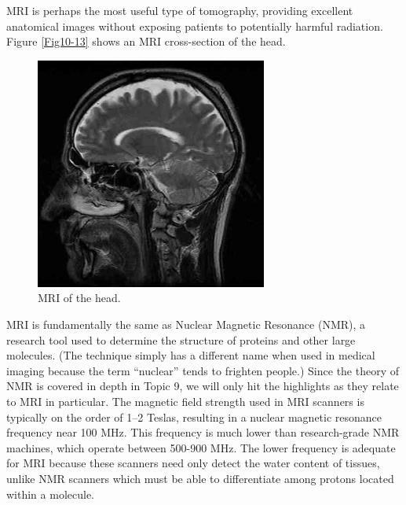 MRI is perhaps the most useful type of tomography, providing excellent anatomical images without exposing patients to potentially harmful radiation.  Figure \ref{Fig10-13} shows an MRI cross-section of the head.
\begin{figure}[!htb]
	\centering
	\includegraphics[width=3.0in]{./figures/Topic10/Fig10-14.jpg}
	\caption{MRI of the head.}
	\label{Fig10-14}
\end{figure}
MRI is fundamentally the same as Nuclear Magnetic Resonance (NMR), a research tool used to determine the structure of proteins and other large molecules.  (The technique simply has a different name when used in medical imaging because the term ``nuclear'' tends to frighten people.)  Since the theory of NMR is covered in depth in Topic 9, we will only hit the highlights as they relate to MRI in particular.  The magnetic field strength used in MRI scanners is typically on the order of 1--2 Teslas, resulting in a nuclear magnetic resonance frequency near 100 MHz.  This frequency is much lower than research-grade NMR machines, which operate between 500-900 MHz.  The lower frequency is adequate for MRI because these scanners need only detect the water content of tissues, unlike NMR scanners which must be able to differentiate among protons located within a molecule.


